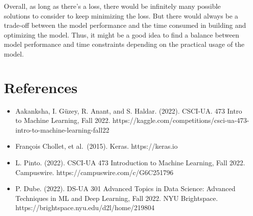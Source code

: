 \documentclass[11pt]{article}
\begin{document}
Overall, as long as there's a loss, there would be infinitely many
possible solutions to consider to keep minimizing the loss. But there
would always be a trade-off between the model performance and the time
consumed in building and optimizing the model. Thus, it might be a good
idea to find a balance between model performance and time constraints
depending on the practical usage of the model.

    \hypertarget{references}{%
\section{References}\label{references}}

\begin{itemize}
\item
  Aakanksha, I. Güzey, R. Anant, and S. Haldar. (2022). CSCI-UA. 473
  Intro to Machine Learning, Fall 2022.
  https://kaggle.com/competitions/csci-ua-473-intro-to-machine-learning-fall22
\item
  François Chollet, et al.~(2015). Keras. https://keras.io
\item
  L. Pinto. (2022). CSCI-UA 473 Introduction to Machine Learning, Fall
  2022. Campuswire. https://campuswire.com/c/G6C251796
\item
  P. Dube. (2022). DS-UA 301 Advanced Topics in Data Science: Advanced
  Techniques in ML and Deep Learning, Fall 2022. NYU Brightspace.
  https://brightspace.nyu.edu/d2l/home/219804
\end{itemize}


    
    
    
\end{document}
